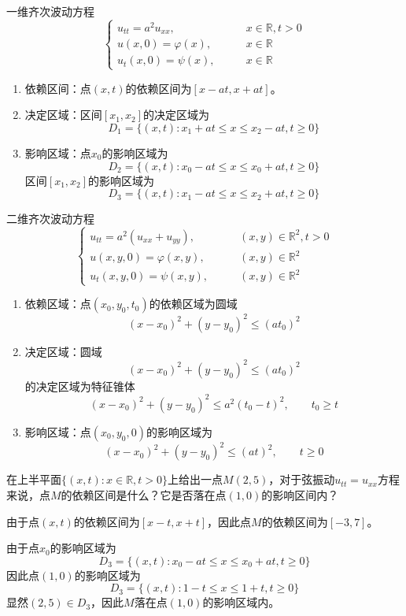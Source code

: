 \documentclass[lang = cn, scheme = chinese, thmcnt = section]{elegantbook}
\newcommand{\R}{\mathbb{R}}            %
\begin{document}
\begin{note}
	一维齐次波动方程
	$$
	\begin{cases}
		u_{tt}=a^2u_{xx},\qquad & x\in \R,t>0\\
		u(x,0)=\varphi(x),\qquad & x\in \R\\
		u_t(x,0)=\psi(x),\qquad & x\in \R
	\end{cases}
	$$
	\begin{enumerate}
		\item 依赖区间：点$(x,t)$的依赖区间为$[x-at,x+at]$。
		\item 决定区域：区间$[x_1,x_2]$的决定区域为
		$$
		D_1=\{ (x,t):x_1+at\le x \le x_2-at,t\ge 0 \}
		$$
		\item 影响区域：点$x_0$的影响区域为
		$$
		D_2=\{ (x,t):x_0-at\le x \le x_0+at,t\ge 0 \}
		$$
		区间$[x_1,x_2]$的影响区域为
		$$
		D_3=\{ (x,t):x_1-at\le x \le x_2+at,t\ge 0 \}
		$$
	\end{enumerate}
\end{note}

\begin{note}
	二维齐次波动方程
	$$
	\begin{cases}
		u_{tt}=a^2(u_{xx}+u_{yy}),\qquad & (x,y)\in \R^2,t>0\\
		u(x,y,0)=\varphi(x,y),\qquad & (x,y)\in \R^2\\
		u_t(x,y,0)=\psi(x,y),\qquad & (x,y)\in \R^2
	\end{cases}
	$$
	\begin{enumerate}
		\item 依赖区域：点$(x_0,y_0,t_0)$的依赖区域为圆域
		$$
		(x-x_0)^2+(y-y_0)^2\le (at_0)^2
		$$
		\item 决定区域：圆域
		$$
		(x-x_0)^2+(y-y_0)^2\le (at_0)^2
		$$
		的决定区域为特征锥体
		$$
		(x-x_0)^2+(y-y_0)^2\le a^2(t_0-t)^2,\qquad t_0\ge t
		$$
		\item 影响区域：点$(x_0,y_0,0)$的影响区域为
		$$
		(x-x_0)^2+(y-y_0)^2\le (at)^2,\qquad t\ge 0
		$$
	\end{enumerate}
\end{note}

\begin{example}
	在上半平面$\{ (x,t):x\in\R,t>0 \}$上给出一点$M(2,5)$，对于弦振动$u_{tt}=u_{xx}$方程来说，点$M$的依赖区间是什么？它是否落在点$(1,0)$​的影响区间内？
\end{example}

\begin{solution}
	由于点$(x,t)$的依赖区间为$[x-t,x+t]$，因此点$M$的依赖区间为$[-3,7]$。
	
	由于点$x_0$的影响区域为
	$$
	D_3=\{ (x,t):x_0-at\le x \le x_0+at,t\ge 0 \}
	$$
	因此点$(1,0)$的影响区域为
	$$
	D_3=\{ (x,t):1-t\le x \le 1+t,t\ge 0 \}
	$$
	显然$(2,5)\in D_3$，因此$M$落在点$(1,0)$的影响区域内。
\end{solution}
\end{document}
